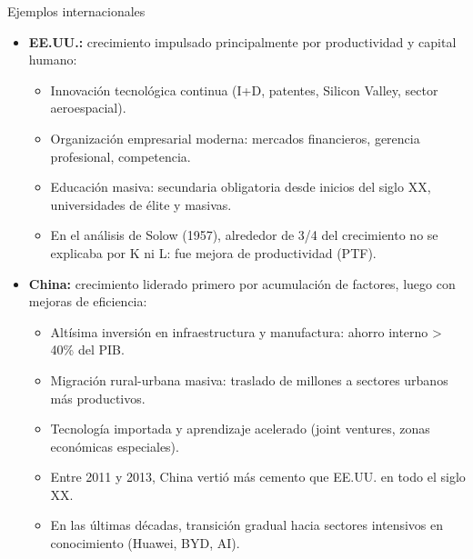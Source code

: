 \documentclass{beamer}
\begin{document}
\begin{frame}{Ejemplos internacionales}
    \small
    \begin{itemize}
        \item \textbf{EE.UU.:} crecimiento impulsado principalmente por productividad y capital humano:
        \begin{itemize}
            \scriptsize
            \item Innovación tecnológica continua (I+D, patentes, Silicon Valley, sector aeroespacial).
            \item Organización empresarial moderna: mercados financieros, gerencia profesional, competencia.
            \item Educación masiva: secundaria obligatoria desde inicios del siglo XX, universidades de élite y masivas.
            \item En el análisis de Solow (1957), alrededor de 3/4 del crecimiento no se explicaba por K ni L: fue mejora de productividad (PTF).
        \end{itemize}
        \item \textbf{China:} crecimiento liderado primero por acumulación de factores, luego con mejoras de eficiencia:
        \begin{itemize}
            \scriptsize
            \item Altísima inversión en infraestructura y manufactura: ahorro interno > 40\% del PIB.
            \item Migración rural-urbana masiva: traslado de millones a sectores urbanos más productivos.
            \item Tecnología importada y aprendizaje acelerado (joint ventures, zonas económicas especiales).
            \item Entre 2011 y 2013, China vertió más cemento que EE.UU. en todo el siglo XX.
            \item En las últimas décadas, transición gradual hacia sectores intensivos en conocimiento (Huawei, BYD, AI).
        \end{itemize}
    \end{itemize}
\end{frame}
\end{document}
